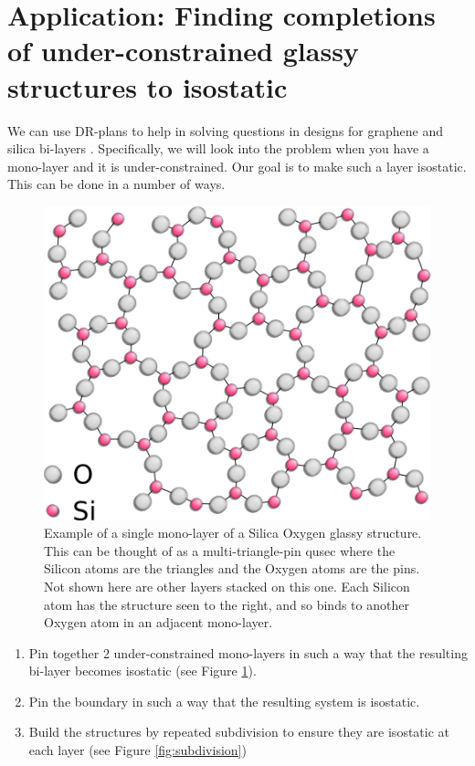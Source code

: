 \section{Application: Finding completions of under-constrained glassy structures to isostatic}
\label{sec:bodypin}

We can use DR-plans to help in solving questions in designs for graphene and silica bi-layers \uncited. Specifically, we will look into the problem when you have a mono-layer and it is under-constrained. Our goal is to make such a layer isostatic. This can be done in a number of ways.

\begin{figure}\centering
    \includegraphics[width=0.4\linewidth]{img/Silica} \hspace{0.5cm}
    \caption{Example of a single mono-layer of a Silica Oxygen glassy structure. This can be thought of as a multi-triangle-pin qusec where the Silicon atoms are the triangles and the Oxygen atoms are the pins. Not shown here are other layers stacked on this one. Each Silicon atom has the structure seen to the right, and so binds to another Oxygen atom in an adjacent mono-layer.}
    \label{fig:silica_glass}
\end{figure}

\begin{enumerate}
    \item Pin together 2 under-constrained mono-layers in such a way that the resulting bi-layer becomes isostatic (see Figure \ref{fig:silica_glass}).
    \item Pin the boundary in such a way that the resulting system is isostatic.
    \item Build the structures by repeated subdivision to ensure they are isostatic at each layer (see Figure \ref{fig:subdivision})
\end{enumerate}

